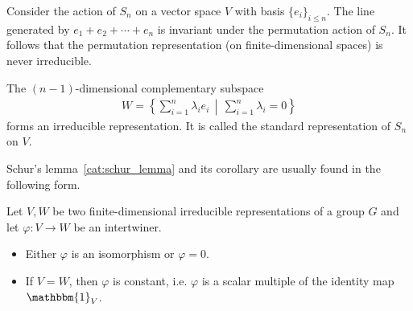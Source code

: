 
    \begin{example}
        Consider the action of $S_n$ on a vector space $V$ with basis $\{e_i\}_{i\leq n}$. The line generated by $e_1+e_2+\cdots+e_n$ is invariant under the permutation action of $S_n$. It follows that the permutation representation (on finite-dimensional spaces) is never irreducible.

        The $(n-1)$-dimensional complementary subspace
        \begin{gather}
            W = \left\{\sum_{i=1}^n\lambda_ie_i\,\middle\vert\,\sum_{i=1}^n\lambda_i=0\right\}
        \end{gather}
        forms an irreducible representation. It is called the standard representation of $S_n$ on $V$.
    \end{example}

    Schur's lemma~\ref{cat:schur_lemma} and its corollary are usually found in the following form.
    \begin{theorem}\label{rep:schurs_lemma}
        Let $V,W$ be two finite-dimensional irreducible representations of a group $G$ and let $\varphi:V\rightarrow W$ be an intertwiner.
        \begin{itemize}
            \item Either $\varphi$ is an isomorphism or $\varphi=0$.
            \item If $V=W$, then $\varphi$ is constant, i.e. $\varphi$ is a scalar multiple of the identity map $\mathbbm{1}_V$.
        \end{itemize}
    \end{theorem}


